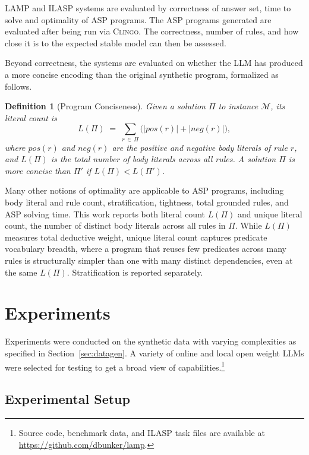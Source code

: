 \documentclass[11pt,a4paper]{article}
\newtheorem{definition}{Definition}
\begin{document}
LAMP and ILASP systems are evaluated by correctness of answer set, time to solve and optimality of ASP programs. The ASP programs generated are evaluated after being run via \textsc{Clingo}. The correctness, number of rules, and how close it is to the expected stable model can then be assessed.

Beyond correctness, the systems are evaluated on whether the LLM has produced a more concise encoding than the original synthetic program, formalized as follows.

\begin{definition}[Program Conciseness]
\label{def:conciseness}
Given a solution $\Pi$ to instance $\mathcal{M}$, its \emph{literal count} is
\[
  L(\Pi) \;=\; \sum_{r\,\in\,\Pi} \bigl(|\mathit{pos}(r)| + |\mathit{neg}(r)|\bigr),
\]
where $\mathit{pos}(r)$ and $\mathit{neg}(r)$ are the positive and negative body literals of rule $r$, and $L(\Pi)$ is the total number of body literals across all rules. A solution $\Pi$ is \emph{more concise} than $\Pi'$ if $L(\Pi) < L(\Pi')$.
\end{definition}

Many other notions of optimality are applicable to ASP programs, including body literal and rule count, stratification, tightness, total grounded rules, and ASP solving time. This work reports both literal count $L(\Pi)$ and unique literal count, the number of distinct body literals across all rules in $\Pi$. While $L(\Pi)$ measures total deductive weight, unique literal count captures predicate vocabulary breadth, where a program that reuses few predicates across many rules is structurally simpler than one with many distinct dependencies, even at the same $L(\Pi)$. Stratification is reported separately.

\section{Experiments}

Experiments were conducted on the synthetic data with varying complexities as specified in Section~\ref{sec:datagen}. A variety of online and local open weight LLMs were selected for testing to get a broad view of capabilities.\footnote{Source code, benchmark data, and ILASP task files are available at \url{https://github.com/dbunker/lamp}.}

\subsection{Experimental Setup}
\end{document}
